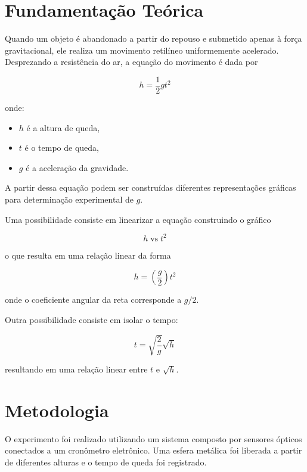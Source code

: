 \documentclass[12pt,a4paper]{article}
\begin{document}
\section{Fundamentação Teórica}

Quando um objeto é abandonado a partir do repouso e submetido apenas à força gravitacional, ele realiza um movimento retilíneo uniformemente acelerado. Desprezando a resistência do ar, a equação do movimento é dada por

\begin{equation}
h = \frac{1}{2}gt^2
\end{equation}

onde:

\begin{itemize}
\item $h$ é a altura de queda,
\item $t$ é o tempo de queda,
\item $g$ é a aceleração da gravidade.
\end{itemize}

A partir dessa equação podem ser construídas diferentes representações gráficas para determinação experimental de $g$.

Uma possibilidade consiste em linearizar a equação construindo o gráfico

\begin{equation}
h \; \text{vs} \; t^2
\end{equation}

o que resulta em uma relação linear da forma

\begin{equation}
h = \left(\frac{g}{2}\right)t^2
\end{equation}

onde o coeficiente angular da reta corresponde a $g/2$.

Outra possibilidade consiste em isolar o tempo:

\begin{equation}
t = \sqrt{\frac{2}{g}}\sqrt{h}
\end{equation}

resultando em uma relação linear entre $t$ e $\sqrt{h}$.

\section{Metodologia}

O experimento foi realizado utilizando um sistema composto por sensores ópticos conectados a um cronômetro eletrônico. Uma esfera metálica foi liberada a partir de diferentes alturas e o tempo de queda foi registrado.
\end{document}
